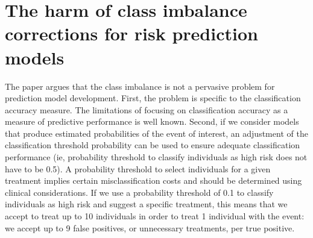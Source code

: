 \section{The harm of class imbalance corrections for risk prediction models}
	The paper argues that the class imbalance is not a pervasive problem for prediction model development. 
	First, the problem is specific to the classification accuracy measure. 
	The limitations of focusing on classification accuracy as a measure of predictive performance is well known. 
	Second, if we consider models that produce estimated probabilities of the event of interest, 
	an adjustment of the classification threshold probability can be used to ensure adequate classification performance 
	(ie, probability threshold to classify individuals as high risk does not have to be 0.5). 
	A probability threshold to select individuals for a given treatment implies certain misclassification costs and should be determined using clinical considerations. 
	If we use a probability threshold of 0.1 to classify individuals as high risk and suggest a specific treatment, 
	this means that we accept to treat up to 10 individuals in order to treat 1 individual with the event: 
	we accept up to 9 false positives, or unnecessary treatments, per true positive.
	

